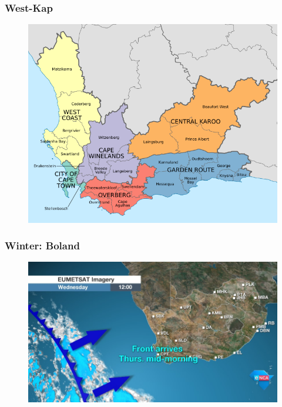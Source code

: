 \documentclass[8pt]{beamer}
\begin{document}
\begin{frame}
	\frametitle{West-Kap}
	\begin{figure}[H]
		\includegraphics[scale=0.3]{western_cape}
	\end{figure}
\end{frame}

\begin{frame}
	\frametitle{Winter: Boland}
	\begin{figure}[H]
		\includegraphics[scale=0.3]{front}
	\end{figure}
\end{frame}
\end{document}
